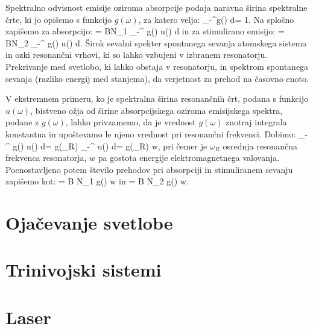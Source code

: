Spektralno odvisnost emisije oziroma absorpcije podaja naravna širina spektralne 
črte, ki jo opišemo s funkcijo $g(\omega)$, za katero velja:
\beq
\int_{-\infty}^\infty g(\omega) d\omega = 1.
\eeq
Na splošno zapišemo za absorpcijo:
\beq
{} = BN_1 \int_{-\infty}^{\infty} g(\omega) u(\omega) d\omega
\eeq
in za stimulirano emisijo:
\beq
{} = BN_2 \int_{-\infty}^{\infty} g(\omega) u(\omega) d\omega.
\eeq
Širok sevalni spekter spontanega sevanja atomskega sistema in ozki resonančni vrhovi, 
ki so lahko vzbujeni v izbranem resonatorju. Prekrivanje med svetlobo, ki lahko obstaja
v resonatorju, in spektrom spontanega sevanja (razliko energij med stanjema), 
da verjetnost za prehod na časovno enoto.

V ekstremnem primeru, ko je spektralna širina resonančnih črt, 
podana s funkcijo $u(\omega)$, bistveno ožja od širine absorpcijskega oziroma
emisijskega spektra, podane z $g(\omega)$, lahko privzamemo, da je vrednost $g(\omega)$
znotraj integrala konstantna in upoštevamo le njeno vrednost pri resonančni frekvenci.
Dobimo:
\beq
\int_{-\infty}^{\infty} g(\omega) u(\omega) d\omega = g(\omega_R) \int_{-\infty}^{\infty}
u(\omega) d\omega = g(\omega_R) w,
\eeq
pri čemer je $\omega_R$ osrednja resonančna frekvenca resonatorja, $w$ pa gostota
energije elektromagnetnega valovanja. Poenostavljeno potem število prehodov pri absorpciji
in stimuliranem sevanju zapišemo kot:
\beq
{} = B N_1 g(\omega) w
\eeq
in
\beq
{} = B N_2 g(\omega) w.
\eeq



\section{Ojačevanje svetlobe}

\section{Trinivojski sistemi}
\section{Laser}
